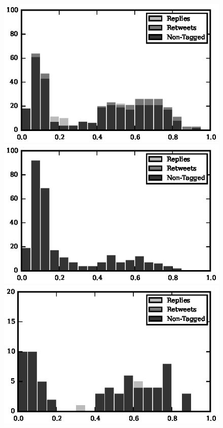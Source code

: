 \begin{figure}[!tb]
\centering
\includegraphics[scale=0.55]{./figures/213501392_histogram.eps}
\includegraphics[scale=0.55]{./figures/808181892_histogram.eps}
\includegraphics[scale=0.55]{./figures/87339782_histogram.eps}

\end{figure}
